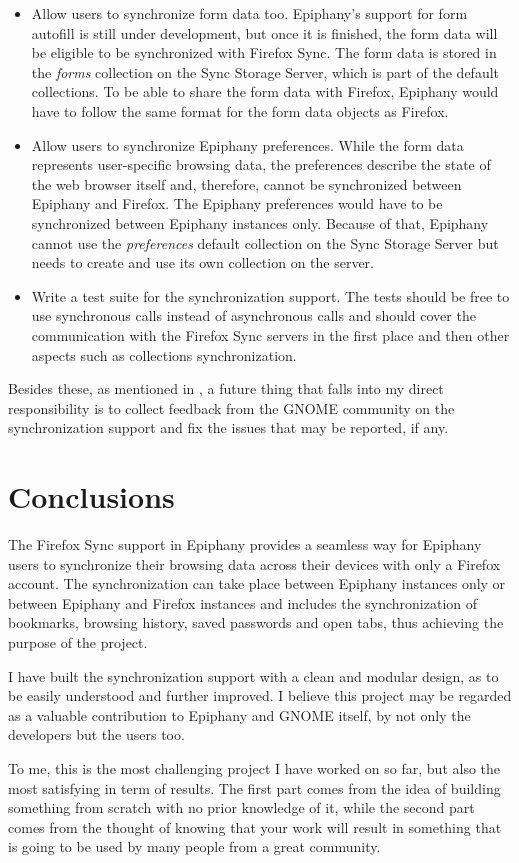 \begin{itemize}
  \item Allow users to synchronize form data too. Epiphany's support for form autofill is still under development, but once it is finished, the form data will be eligible to be synchronized with Firefox Sync. The form data is stored in the \textit{forms} collection on the Sync Storage Server, which is part of the default collections. To be able to share the form data with Firefox, Epiphany would have to follow the same format for the form data objects as Firefox.

  \item Allow users to synchronize Epiphany preferences. While the form data represents user-specific browsing data, the preferences describe the state of the web browser itself and, therefore, cannot be synchronized between Epiphany and Firefox. The Epiphany preferences would have to be synchronized between Epiphany instances only. Because of that, Epiphany cannot use the \textit{preferences} default collection on the Sync Storage Server but needs to create and use its own collection on the server.

  \item Write a test suite for the synchronization support. The tests should be free to use synchronous calls instead of asynchronous calls and should cover the communication with the Firefox Sync servers in the first place and then other aspects such as collections synchronization.
\end{itemize}

Besides these, as mentioned in , a future thing that falls into my direct responsibility is to collect feedback from the GNOME community on the synchronization support and fix the issues that may be reported, if any.

\section{Conclusions}
\label{section:conclusions}

The Firefox Sync support in Epiphany provides a seamless way for Epiphany users to synchronize their browsing data across their devices with only a Firefox account. The synchronization can take place between Epiphany instances only or between Epiphany and Firefox instances and includes the synchronization of bookmarks, browsing history, saved passwords and open tabs, thus achieving the purpose of the project.

I have built the synchronization support with a clean and modular design, as to be easily understood and further improved. I believe this project may be regarded as a valuable contribution to Epiphany and GNOME itself, by not only the developers but the users too.

To me, this is the most challenging project I have worked on so far, but also the most satisfying in term of results. The first part comes from the idea of building something from scratch with no prior knowledge of it, while the second part comes from the thought of knowing that your work will result in something that is going to be used by many people from a great community.
